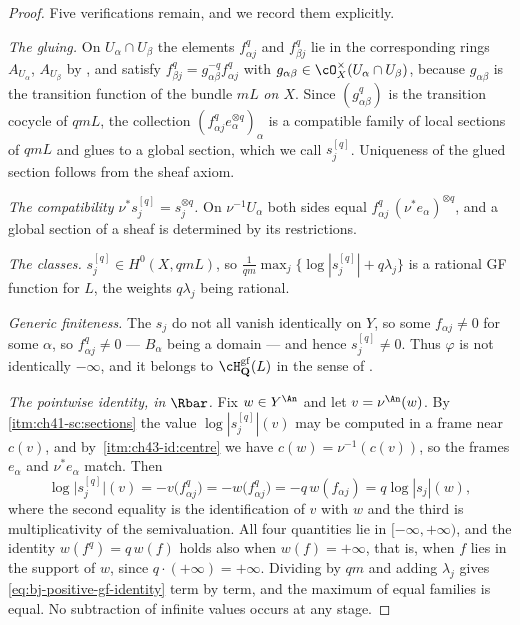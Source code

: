\begin{proof}
Five verifications remain, and we record them explicitly.

\emph{The gluing.}  On $U_\alpha\cap U_\beta$ the elements
$f_{\alpha j}^q$ and $f_{\beta j}^q$ lie in the corresponding rings
$A_{U_\alpha}$, $A_{U_\beta}$ by
, and satisfy
$f_{\beta j}^q=g_{\alpha\beta}^{-q}f_{\alpha j}^q$ with
$g_{\alpha\beta}\in\cO_X^\times(U_\alpha\cap U_\beta)$, because
$g_{\alpha\beta}$ is the transition function of the bundle $mL$
\emph{on $X$}.  Since $(g_{\alpha\beta}^{q})$ is the transition cocycle
of $qmL$, the collection $(f_{\alpha j}^q e_\alpha^{\otimes q})_\alpha$
is a compatible family of local sections of $qmL$ and glues to a global
section, which we call $s_j^{[q]}$.  Uniqueness of the glued section
follows from the sheaf axiom.

\emph{The compatibility $\nu^*s_j^{[q]}=s_j^{\otimes q}$.}  On
$\nu^{-1}U_\alpha$ both sides equal
$f_{\alpha j}^q\,(\nu^*e_\alpha)^{\otimes q}$, and a global section of a
sheaf is determined by its restrictions.

\emph{The classes.}  $s_j^{[q]}\in H^0(X,qmL)$, so
$\frac1{qm}\max_j\{\log|s_j^{[q]}|+q\lambda_j\}$ is a rational GF function
for $L$, the weights $q\lambda_j$ being rational.

\emph{Generic finiteness.}  The $s_j$ do not all vanish identically on
$Y$, so some $f_{\alpha j}\ne0$ for some $\alpha$, so
$f_{\alpha j}^q\ne0$ --- $B_\alpha$ being a domain --- and hence
$s_j^{[q]}\ne0$.  Thus $\varphi$ is not identically $-\infty$, and it
belongs to $\cH^{\mathrm{gf}}_{\mathbf Q}(L)$ in the sense of
.

\emph{The pointwise identity, in $\Rbar$.}  Fix $w\in Y^{\An}$ and let
$v=\nu^{\An}(w)$.  By
\,\cref{itm:ch41-sc:sections} the value
$\log|s_j^{[q]}|(v)$ may be computed in a frame near $c(v)$, and by
\,\cref{itm:ch43-id:centre} we have
$c(w)=\nu^{-1}(c(v))$, so the frames $e_\alpha$ and $\nu^*e_\alpha$
match.  Then
\[
 \log\bigl|s_j^{[q]}\bigr|(v)
 =-v\bigl(f_{\alpha j}^q\bigr)
 =-w\bigl(f_{\alpha j}^q\bigr)
 =-q\,w(f_{\alpha j})
 =q\log|s_j|(w),
\]
where the second equality is the identification of $v$ with $w$ and the
third is multiplicativity of the semivaluation.  All four quantities lie in
$[-\infty,+\infty)$, and the identity $w(f^q)=q\,w(f)$ holds also when
$w(f)=+\infty$, that is, when $f$ lies in the support of $w$, since
$q\cdot(+\infty)=+\infty$.  Dividing by $qm$ and adding $\lambda_j$
gives \eqref{eq:bj-positive-gf-identity} term by term, and the maximum of
equal families is equal.  No subtraction of infinite values occurs at any
stage.
\end{proof}

